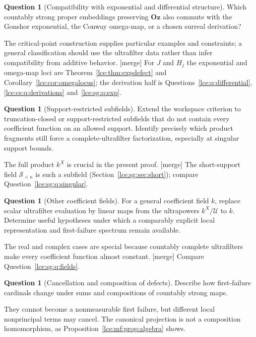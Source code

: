 \documentclass[11pt,letterpaper]{article}
\numberwithin{equation}{section}
\theoremstyle{definition}
\newtheorem{question}[theorem]{Question}
\theoremstyle{remark}
\newcommand{\Oz}{\mathbf{Oz}}
\newcommand{\Sk}{\mathscr S_{<\kappa}}
\newcommand{\thref}[1]{Theorem~\ref{#1}}
\newcommand{\prref}[1]{Proposition~\ref{#1}}
\newcommand{\mergetag}{\textup{\textsf{\small[merge]}}}%
\begin{document}
\begin{question}[Compatibility with exponential and differential structure]\label{lce:mf:q:exp}
Which countably strong proper embeddings preserving $\Oz$ also commute with
the Gonshor exponential, the Conway omega-map, or a chosen surreal
derivation?
\end{question}
The critical-point construction supplies particular examples and
constraints; a general classification should use the ultrafilter data rather
than infer compatibility from additive behavior. \mergetag{} For $J$ and
$H_j$ the exponential and omega-map loci are \thref{lce:thm:expdefect} and
Corollary~\ref{lce:cor:omegalocus}; the derivation half is
Questions~\ref{lce:q:differential}, \ref{lce:cs:q:derivations}
and~\ref{lce:sg:q:exp}.

\begin{question}[Support-restricted subfields]\label{lce:mf:q:subfields}
Extend the workspace criterion to truncation-closed or support-restricted
subfields that do not contain every coefficient function on an allowed
support. Identify precisely which product fragments still force a
complete-ultrafilter factorization, especially at singular support bounds.
\end{question}
The full product $k^X$ is crucial in the present proof. \mergetag{} The
short-support field $\Sk$ is such a subfield (Section~\ref{lce:sg:sec:short});
compare Question~\ref{lce:sg:q:singular}.

\begin{question}[Other coefficient fields]\label{lce:mf:q:fields}
For a general coefficient field $k$, replace scalar ultrafilter evaluation
by linear maps from the ultrapowers $k^X/\mathcal U$ to $k$. Determine
useful hypotheses under which a comparably explicit local representation and
first-failure spectrum remain available.
\end{question}
The real and complex cases are special because countably complete
ultrafilters make every coefficient function almost constant. \mergetag{}
Compare Question~\ref{lce:sg:q:fields}.

\begin{question}[Cancellation and composition of defects]\label{lce:mf:q:composition}
Describe how first-failure cardinals change under sums and compositions of
countably strong maps.
\end{question}
They cannot become a nonmeasurable first failure, but different local
nonprincipal terms may cancel. The canonical projection is not a composition
homomorphism, as \prref{lce:mf:prop:algebra} shows.
\end{document}
